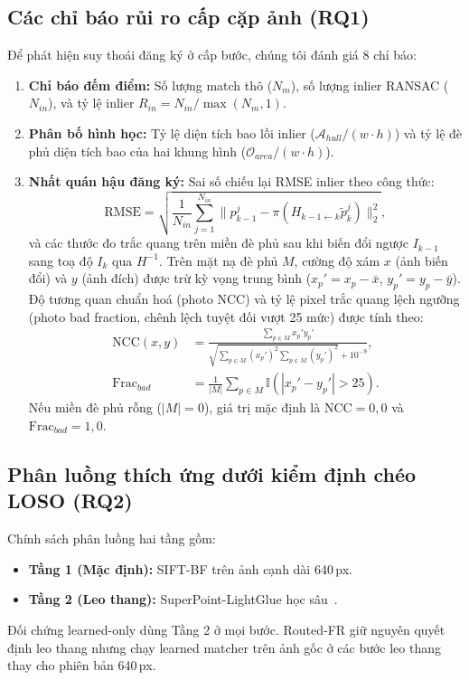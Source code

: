 \documentclass[conference]{IEEEtran}
\begin{document}
\subsection{Các chỉ báo rủi ro cấp cặp ảnh (RQ1)}
\label{subsec:indicators}

Để phát hiện suy thoái đăng ký ở cấp bước, chúng tôi đánh giá 8 chỉ báo:
\begin{enumerate}
    \item \textbf{Chỉ báo đếm điểm:} Số lượng match thô ($N_m$), số lượng inlier RANSAC ($N_{in}$), và tỷ lệ inlier $R_{in} = N_{in} / \max(N_m, 1)$.
    \item \textbf{Phân bố hình học:} Tỷ lệ diện tích bao lồi inlier ($\mathcal{A}_{hull} / (w \cdot h)$) và tỷ lệ đè phủ diện tích bao của hai khung hình ($\mathcal{O}_{area} / (w \cdot h)$).
    \item \textbf{Nhất quán hậu đăng ký:} Sai số chiếu lại RMSE inlier theo công thức:
    \begin{equation}
    \text{RMSE} = \sqrt{\frac{1}{N_{in}} \sum_{j=1}^{N_{in}} \| p_{k-1}^j - \pi(H_{k-1 \leftarrow k} \tilde{p}_k^j) \|_2^2},
    \label{eq:rmse_inlier_vi}
    \end{equation}
    và các thước đo trắc quang trên miền đè phủ sau khi biến đổi ngược $I_{k-1}$ sang toạ độ $I_k$ qua $H^{-1}$. Trên mặt nạ đè phủ $M$, cường độ xám $x$ (ảnh biến đổi) và $y$ (ảnh đích) được trừ kỳ vọng trung bình ($x_p' = x_p - \bar{x}$, $y_p' = y_p - \bar{y}$). Độ tương quan chuẩn hoá (photo NCC) và tỷ lệ pixel trắc quang lệch ngưỡng (photo bad fraction, chênh lệch tuyệt đối vượt 25 mức) được tính theo:
    \begin{align}
    \text{NCC}(x, y) &= \frac{\sum_{p \in M} x_p' y_p'}{\sqrt{\sum_{p \in M} (x_p')^2 \sum_{p \in M} (y_p')^2} + 10^{-9}}, \label{eq:ncc_vi} \\
    \text{Frac}_{bad} &= \frac{1}{|M|} \sum_{p \in M} \mathbb{I}(|x_p' - y_p'| > 25). \label{eq:photo_bad_vi}
    \end{align}
    Nếu miền đè phủ rỗng ($|M| = 0$), giá trị mặc định là $\text{NCC} = 0{,}0$ và $\text{Frac}_{bad} = 1{,}0$.
\end{enumerate}

\subsection{Phân luồng thích ứng dưới kiểm định chéo LOSO (RQ2)}
\label{subsec:routing_method}

Chính sách phân luồng hai tầng gồm:
\begin{itemize}
    \item \textbf{Tầng 1 (Mặc định):} SIFT-BF trên ảnh cạnh dài 640\,px.
    \item \textbf{Tầng 2 (Leo thang):} SuperPoint-LightGlue học sâu~\cite{detone2018,lindenberger2023}.
\end{itemize}
Đối chứng learned-only dùng Tầng 2 ở mọi bước. Routed-FR giữ nguyên quyết định leo thang nhưng chạy learned matcher trên ảnh gốc ở các bước leo thang thay cho phiên bản 640\,px.
\end{document}
